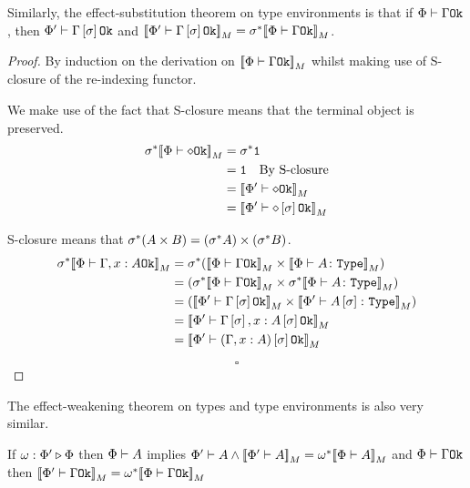 \documentclass{Report}
\begin{document}
\begin{theorem}
    Similarly, the effect-substitution theorem on type environments is that if $\Phi\vdash \Gamma \texttt{Ok}$, then $\Phi'\vdash \Gamma\left[\sigma\right] \texttt{Ok}$ and ${\bf [\![}\Phi'\vdash \Gamma\left[\sigma\right] \texttt{Ok}{\bf ]\!]}_M = \sigma^*{\bf [\![}\Phi\vdash \Gamma \texttt{Ok}{\bf ]\!]}_M$.
\end{theorem}

\begin{proof}
    By induction on the derivation on ${\bf [\![}\Phi\vdash \Gamma \texttt{Ok}{\bf ]\!]}_M$ whilst making use of S-closure of the re-indexing functor.

    We make use of the fact that S-closure means that the terminal object is preserved.
    \begin{align}
        \sigma^*{\bf [\![}\Phi\vdash \diamond \texttt{Ok}{\bf ]\!]}_M &=\sigma^*\texttt{1}\\
        & = \texttt{1}\quad\text{By S-closure}\\
        &= {\bf [\![}\Phi'\vdash \diamond \texttt{Ok}{\bf ]\!]}_M\\
        &= {\bf [\![}\Phi'\vdash \diamond\left[\sigma\right] \texttt{Ok}{\bf ]\!]}_M\\
    \end{align}
    
    S-closure means that $\sigma^*(A \times B) = (\sigma^* A)\times (\sigma^* B)$.
    \begin{align}
       \si\star\deno{\wellformedok{\P}{\gax}} &= \si\star(\deno{\wellformedok{\P}{\G}} \times \deno{\typerelation{\P}{A}{\type}}) \\
       & = (\si\star\deno{\wellformedok{\P}{\G}} \times \si\star\deno{\typerelation{\P}{A}{\type}})\\
        & = (\deno{\wellformedok{\P'}{\G\ssi}} \times \deno{\typerelation{\P'}{A\ssi}{\type}})\\
        & = \deno{\wellformedok{\P'}{\G\ssi, x: A\ssi}}\\
        & = \deno{\wellformedok{\P'}{(\gax)\ssi}}\\
    \end{align}

    $$\square$$
\end{proof}


The effect-weakening theorem on types and type environments is also very similar.

\begin{theorem}
    If $\omega : \Phi' \triangleright \Phi$ then $\Phi\vdash A$ implies $\Phi'\vdash A \wedge {\bf [\![}\Phi'\vdash A{\bf ]\!]}_M = \omega^*{\bf [\![}\Phi\vdash A{\bf ]\!]}_M$ and $\Phi\vdash \Gamma \texttt{Ok}$ then ${\bf [\![}\Phi'\vdash \Gamma \texttt{Ok}{\bf ]\!]}_M = \omega^*{\bf [\![}\Phi\vdash \Gamma \texttt{Ok}{\bf ]\!]}_M$
\end{theorem}
\end{document}
